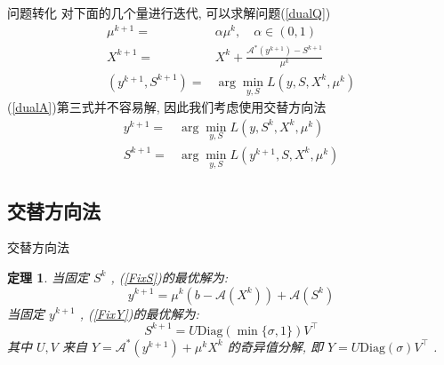 \documentclass[slidestop, compress, mathserif, UTF8]{beamer}
\newtheorem{theo}{\bf \textcolor[rgb]{0.8,0,0}{定理}}[section]          %
\numberwithin{equation}{section}                                        %
\begin{document}
			\begin{frame}[t]{问题转化}
				对下面的几个量进行迭代, 可以求解问题(\ref{dualQ})
				\begin{equation}
					\begin{split}\label{dualA}
							\mu^{k + 1}
						=	& \alpha \mu^k, \quad \alpha \in (0,1)\\
							X^{k + 1}
						=	& X^k + \frac{\mathcal{A}^*(y^{k + 1}) - S^{k + 1}}{\mu^k}\\
							(y^{k + 1}, S^{k + 1}) 
						=	& \arg \min_{y, S}L(y, S, X^k, \mu^k)
					\end{split}
				\end{equation}
				(\ref{dualA})第三式并不容易解, 因此我们考虑使用交替方向法
				\begin{align}
						y^{k + 1}
					=	& \arg \min_{y, S}L(y, S^k, X^k, \mu^k) \label{FixS}\\
						S^{k + 1}
					=	& \arg \min_{y, S}L(y^{k + 1}, S, X^k, \mu^k) \label{FixY}
				\end{align}
			\end{frame}
		\subsection{交替方向法}
			\begin{frame}[t]{交替方向法}
				\begin{theo}
					当固定 $S^k$ , (\ref{FixS})的最优解为:
						\begin{equation}\label{dualAY}
							y^{k + 1} = \mu^k(b - \mathcal{A}(X^k)) + \mathcal{A}(S^k)
						\end{equation}
					当固定 $y^{k + 1}$ , (\ref{FixY})的最优解为:
						\begin{equation}\label{dualAS}
							S^{k + 1} = U \text{Diag}(\min \{\sigma, 1\}) V^\top
						\end{equation}
					其中 $U, V$ 来自 $Y = \mathcal{A}^*(y^{k + 1}) + \mu^k X^k$ 的奇异值分解, 即 $Y = U \text{Diag}(\sigma) V^\top$ .
				\end{theo}
			\end{frame}
\end{document}
